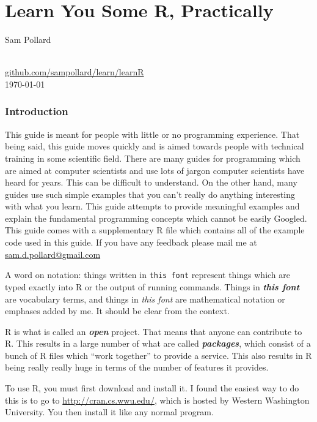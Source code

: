 \documentclass[12pt]{article}
\theoremstyle{remark}
\newcommand{\vocab}[1]{\textbf{\emph{#1}}}
\begin{document}
\part{Learn You Some R, Practically}
\begin{center}
	\begin{Large}
	Sam Pollard
	\end{Large}
	\\
	\url{github.com/sampollard/learn/learnR}
	\\
	\today
\end{center}
\section{Introduction}

This guide is meant for people with little or no programming experience. That being said, this guide moves quickly and is aimed towards people with technical training in some scientific field. There are many guides for programming which are aimed at computer scientists and use lots of jargon computer scientists have heard for years. This can be difficult to understand. On the other hand, many guides use such simple examples that you can't really do anything interesting with what you learn. This guide attempts to provide meaningful examples and explain the fundamental programming concepts which cannot be easily Googled. This guide comes with a supplementary R file which contains all of the example code used in this guide. If you have any feedback please mail me at \url{sam.d.pollard@gmail.com}

A word on notation: things written in \verb|this font| represent things which are typed exactly into R or the output of running commands. Things in \vocab{this font} are vocabulary terms, and things in \emph{this font} are mathematical notation or emphases added by me. It should be clear from the context.

R is what is called an \vocab{open} project. That means that anyone can contribute to R. This results in a large number of what are called \vocab{packages}, which consist of a bunch of R files which ``work together'' to provide a service. This also results in R being really really huge in terms of the number of features it provides.

To use R, you must first download and install it. I found the easiest way to do this is to go to \url{http://cran.cs.wwu.edu/}, which is hosted by Western Washington University. You then install it like any normal program.
\end{document}

